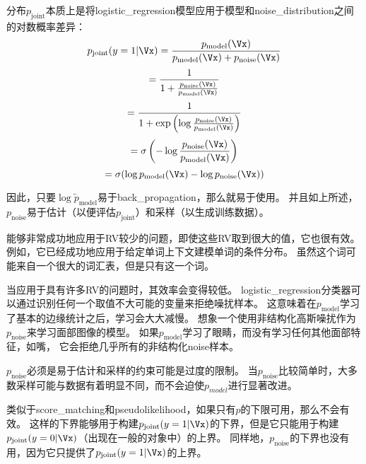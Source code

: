 分布$p_{\text{joint}}$本质上是将\gls{logistic_regression}模型应用于模型和\gls{noise_distribution}之间的对数概率差异：
\begin{equation}
	p_{\text{joint}} (y = 1 | \Vx) = \frac{ p_{\text{model}}(\Vx) }{ p_{\text{model}}(\Vx) + p_{\text{noise}}(\Vx) }
\end{equation}
\begin{equation}
 = \frac{1}{1 + \frac{ p_{\text{noise}}(\Vx) }{ p_{\text{model}}(\Vx) }}
\end{equation}
\begin{equation}
= \frac{1}{1 + \exp \left( \log \frac{ p_{\text{noise}}(\Vx) }{ p_{\text{model}}(\Vx) } \right)}
\end{equation}
\begin{equation}
	= \sigma \left( - \log \frac{ p_{\text{noise}} (\Vx) }{ p_{\text{model}} (\Vx) } \right)
\end{equation}
\begin{equation}
	= \sigma ( \log p_{\text{model}} (\Vx) - \log p_{\text{noise}} (\Vx)  )
\end{equation}


因此，只要$\log \tilde{p}_{\text{model}}$易于\gls{back_propagation}，那么就易于使用。
并且如上所述，$p_{\text{noise}}$易于估计（以便评估$p_{\text{joint}}$）和采样（以生成训练数据）。


能够非常成功地应用于\gls{RV}较少的问题，即使这些\gls{RV}取到很大的值，它也很有效。
例如，它已经成功地应用于给定单词上下文建模单词的条件分布\citep{Mnih2013}。
虽然这个词可能来自一个很大的词汇表，但是只有这一个词。


当应用于具有许多\gls{RV}的问题时，其效率会变得较低。
\gls{logistic_regression}分类器可以通过识别任何一个取值不大可能的变量来拒绝噪扰样本。
这意味着在$p_{\text{model}}$学习了基本的边缘统计之后，学习会大大减慢。
想象一个使用非结构化高斯噪扰作为$p_{\text{noise}}$来学习面部图像的模型。
如果$p_{\text{model}}$学习了眼睛，而没有学习任何其他面部特征，如嘴， 它会拒绝几乎所有的非结构化\gls{noise}样本。


$p_{\text{noise}}$必须是易于估计和采样的约束可能是过度的限制。
当$p_{\text{noise}}$比较简单时，大多数采样可能与数据有着明显不同，而不会迫使$p_{model}$进行显著改进。


类似于\gls{score_matching}和\gls{pseudolikelihood}，如果只有$p$的下限可用，那么不会有效。
这样的下界能够用于构建$p_{\text{joint}}( y = 1 | \Vx)$的下界，但是它只能用于构建$p_{\text{joint}}(y = 0 | \Vx)$（出现在一般的对象中）的上界。
同样地，$p_{\text{noise}}$的下界也没有用，因为它只提供了$p_{\text{joint}}( y = 1 | \Vx)$的上界。


